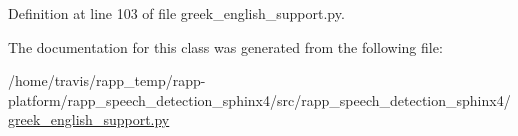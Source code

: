 Definition at line 103 of file greek\-\_\-english\-\_\-support.\-py.



The documentation for this class was generated from the following file\-:\begin{DoxyCompactItemize}
\item 
/home/travis/rapp\-\_\-temp/rapp-\/platform/rapp\-\_\-speech\-\_\-detection\-\_\-sphinx4/src/rapp\-\_\-speech\-\_\-detection\-\_\-sphinx4/\hyperlink{greek__english__support_8py}{greek\-\_\-english\-\_\-support.\-py}\end{DoxyCompactItemize}
